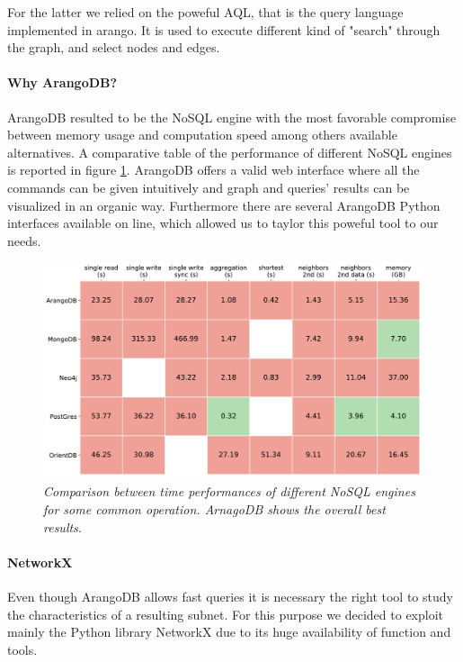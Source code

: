 \documentclass[11pt,twocolumn]{article}
\begin{document}
For the latter we relied on the poweful AQL, that is the query language implemented in arango. It is used to execute different kind of "search" through the graph, and select nodes and edges.

\paragraph{Why ArangoDB?}
ArangoDB resulted to be the NoSQL engine with the most favorable compromise between memory usage and computation speed among others available alternatives. A comparative table of the performance of different NoSQL engines is reported in figure \ref{fig:tab}.
ArangoDB offers a valid web interface where all the commands can be given intuitively and graph and queries' results can be visualized in an organic way.
Furthermore there are several ArangoDB Python interfaces available on line, which allowed us to taylor this poweful tool to our needs.

\begin{figure}[ht!]
\includegraphics[width=\columnwidth]{images/arango_perf.pdf}
\caption{\small{\textit{Comparison between time performances of different NoSQL engines for some common operation. ArnagoDB shows the overall best results. }}}
\label{fig:tab}
\end{figure}

\paragraph{NetworkX}
Even though ArangoDB allows fast queries it is necessary the right tool to study the characteristics of a resulting subnet. For this purpose we decided to exploit mainly the Python library NetworkX \cite{WEBSITE:networkx} due to its huge availability of function and tools.
\end{document}

